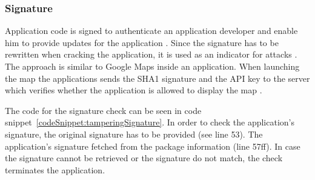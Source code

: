 \subsubsection{Signature} \label{subsection:counter-improve-tampering-signature}
Application code is signed to authenticate an application developer and enable him to provide updates for the application \cite{androidSigning}.
Since the signature has to be rewritten when cracking the application, it is used as an indicator for attacks \cite{tamperSignature}.
\newline
The approach is similar to Google Maps inside an application.
When launching the map the applications sends the SHA1 signature and the API key to the server which verifies whether the application is allowed to display the map \cite{maps}.
\newline

The code for the signature check can be seen in code snippet~\ref{codeSnippet:tamperingSignature}.
In order to check the application's signature, the original signature has to be provided (see line 53).
The application's signature fetched from the package information (line 57ff).
In case the signature cannot be retrieved or the signature do not match, the check terminates the application.
